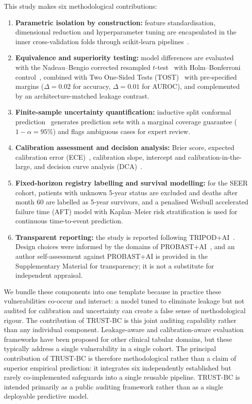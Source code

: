 \documentclass[11pt,a4paper]{article}
\begin{document}
This study makes six methodological contributions:
\begin{enumerate}
\item \textbf{Parametric isolation by construction:} feature standardisation, dimensional reduction and hyperparameter tuning are encapsulated in the inner cross-validation folds through scikit-learn pipelines~\cite{sklearn}.
\item \textbf{Equivalence and superiority testing:} model differences are evaluated with the Nadeau--Bengio corrected resampled $t$-test~\cite{nadeau2003} with Holm--Bonferroni control~\cite{holm1979}, combined with Two One-Sided Tests (TOST)~\cite{schuirmann1987,walker2011} with pre-specified margins ($\Delta=0.02$ for accuracy, $\Delta=0.01$ for AUROC), and complemented by an architecture-matched leakage contrast.
\item \textbf{Finite-sample uncertainty quantification:} inductive split conformal prediction~\cite{angelopoulos2021,vovk2005} generates prediction sets with a marginal coverage guarantee ($1-\alpha=95\%$) and flags ambiguous cases for expert review.
\item \textbf{Calibration assessment and decision analysis:} Brier score, expected calibration error (ECE)~\cite{vancalster2019}, calibration slope, intercept and calibration-in-the-large, and decision curve analysis (DCA)~\cite{vickers2006}.
\item \textbf{Fixed-horizon registry labelling and survival modelling:} for the SEER cohort, patients with unknown 5-year status are excluded and deaths after month 60 are labelled as 5-year survivors, and a penalised Weibull accelerated failure time (AFT) model with Kaplan--Meier risk stratification is used for continuous time-to-event prediction.
\item \textbf{Transparent reporting:} the study is reported following TRIPOD+AI~\cite{collins2024tripod}. Design choices were informed by the domains of PROBAST+AI~\cite{moons2025probast}, and an author self-assessment against PROBAST+AI is provided in the Supplementary Material for transparency; it is not a substitute for independent appraisal.
\end{enumerate}

We bundle these components into one template because in practice these vulnerabilities co-occur and interact: a model tuned to eliminate leakage but not audited for calibration and uncertainty can create a false sense of methodological rigour. The contribution of TRUST-BC is this joint auditing capability rather than any individual component. Leakage-aware and calibration-aware evaluation frameworks have been proposed for other clinical tabular domains, but these typically address a single vulnerability in a single cohort. The principal contribution of TRUST-BC is therefore methodological rather than a claim of superior empirical prediction: it integrates six independently established but rarely co-implemented safeguards into a single reusable pipeline. TRUST-BC is intended primarily as a public auditing framework rather than as a single deployable predictive model.
\end{document}
